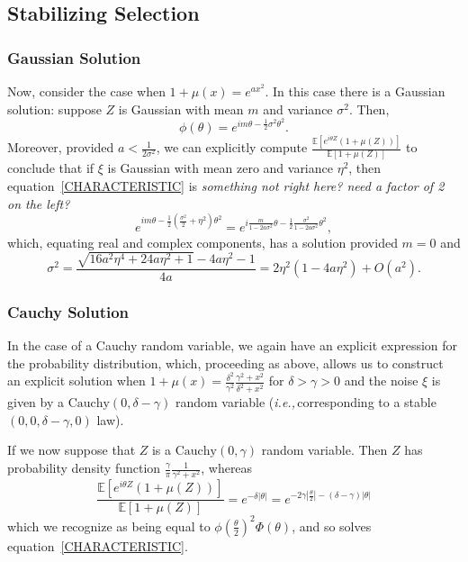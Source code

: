 \documentclass{article}
\newcommand{\ie}{\textit{i.e.,}\,}
\newcommand{\comment}[1]{{\color{blue} \it #1}}
\theoremstyle{remark}
\theoremstyle{definition}
\begin{document}
\subsection{Stabilizing Selection}
    \label{sec:stabilizing_selection}

\subsubsection{Gaussian Solution}
    \label{sec:stabilizing_gaussian}

Now, consider the case when $1+ \mu(x) = e^{a x^{2}}$.  In this case there is a Gaussian solution: suppose $Z$ is Gaussian with mean $m$ and variance $\sigma^{2}$.  Then,
\[
	\phi(\theta) = e^{i m \theta - \frac{1}{2} \sigma^{2} \theta^{2}}.
\]
Moreover, provided $a < \frac{1}{2\sigma^{2}}$, we can explicitly compute $\frac{\mathbb{E}\left[e^{i \theta Z}(1+\mu(Z))\right]}{\mathbb{E}[1+\mu(Z)]}$  to conclude that
if $\xi$ is Gaussian with mean zero and variance $\eta^2$,
then equation~\eqref{CHARACTERISTIC} is
\comment{something not right here? need a factor of 2 on the left?}
\[
	e^{i m \theta - \frac{1}{2} \left(\frac{\sigma^{2}}{2} + \eta^{2}\right)\theta^{2}}
	= e^{i \frac{m}{1-2 a \sigma^{2}}\theta 
		- \frac{1}{2} \frac{\sigma^{2}}{1-2 a \sigma^{2}}\theta^{2}},
\]
which, equating real and complex components, has a solution provided $m = 0$ and
\[
	\sigma^{2} = \frac{\sqrt{16 a^{2} \eta^{4} + 24 a \eta^{2}+1} - 4a \eta^{2} -1}{4a} 
	=  2\eta^{2}(1-4a\eta^{2}) + O(a^{2}).
\]

\subsubsection{Cauchy Solution}
    \label{sec:stabilizing_cauchy}

In the case of a Cauchy random variable, we again have an explicit expression for the probability distribution, which, proceeding as above, allows us to construct an explicit solution when $1+ \mu(x) = \frac{\delta^{2}}{\gamma^{2}} \frac{\gamma^{2} + x^{2}}{\delta^{2} + x^{2}}$ for $\delta > \gamma > 0$ and the noise $\xi$ is given by a $\text{Cauchy}(0,\delta-\gamma)$ random variable (\ie corresponding to a stable $(0,0,\delta-\gamma,0)$ law).

If we now suppose that $Z$ is a $\text{Cauchy}(0,\gamma)$ random variable.  Then $Z$ has probability density function $\frac{\gamma}{\pi} \frac{1}{\gamma^{2} + x^{2}}$, whereas 
\[
	\frac{\mathbb{E}\left[e^{i \theta Z}(1+\mu(Z))\right]}{\mathbb{E}[1+\mu(Z)]}
	= e^{-\delta |\theta|} = e^{-2\gamma \left|\frac{\theta}{2}\right|-(\delta-\gamma)|\theta|}
\]
which we recognize as being equal to $\phi\left(\frac{\theta}{2}\right)^{2} \Phi(\theta)$,
and so solves equation~\eqref{CHARACTERISTIC}.
\end{document}
